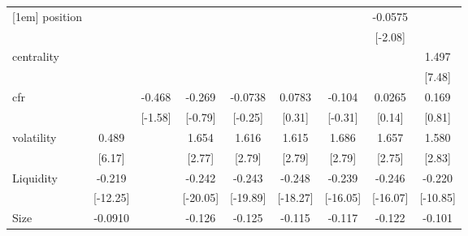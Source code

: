 {\begin{tabular}{l*{8}{c}}
[1em]
position            &                     &                     &                     &                     &                     &                     &     -0.0575         &                     \\
                    &                     &                     &                     &                     &                     &                     &     [-2.08]         &                     \\
[1em]
centrality          &                     &                     &                     &                     &                     &                     &                     &       1.497\sym{***}\\
                    &                     &                     &                     &                     &                     &                     &                     &      [7.48]         \\
[1em]
cfr                 &                     &      -0.468         &      -0.269         &     -0.0738         &      0.0783         &      -0.104         &      0.0265         &       0.169         \\
                    &                     &     [-1.58]         &     [-0.79]         &     [-0.25]         &      [0.31]         &     [-0.31]         &      [0.14]         &      [0.81]         \\
[1em]
volatility          &       0.489\sym{**} &                     &       1.654\sym{*}  &       1.616\sym{*}  &       1.615\sym{*}  &       1.686\sym{*}  &       1.657\sym{*}  &       1.580\sym{*}  \\
                    &      [6.17]         &                     &      [2.77]         &      [2.79]         &      [2.79]         &      [2.79]         &      [2.75]         &      [2.83]         \\
[1em]
Liquidity           &      -0.219\sym{***}&                     &      -0.242\sym{***}&      -0.243\sym{***}&      -0.248\sym{***}&      -0.239\sym{***}&      -0.246\sym{***}&      -0.220\sym{***}\\
                    &    [-12.25]         &                     &    [-20.05]         &    [-19.89]         &    [-18.27]         &    [-16.05]         &    [-16.07]         &    [-10.85]         \\
[1em]
Size                &     -0.0910\sym{**} &                     &      -0.126\sym{**} &      -0.125\sym{**} &      -0.115\sym{*}  &      -0.117\sym{*}  &      -0.122\sym{*}  &      -0.101\sym{*}  \\

\end{tabular}}
